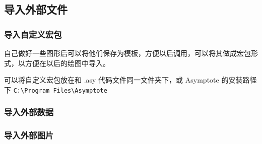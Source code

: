 \subsection{导入外部文件}


\subsubsection{导入自定义宏包}
自己做好一些图形后可以将他们保存为模板，方便以后调用，可以将其做成宏包形式，以方便在以后的绘图中导入。

可以将自定义宏包放在和 .asy 代码文件同一文件夹下，或 Asymptote 的安装路径下 \verb$C:\Program Files\Asymptote$

\subsubsection{导入外部数据} 


\subsubsection{导入外部图片} 